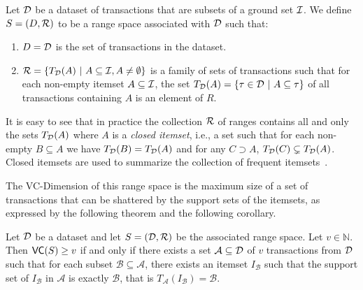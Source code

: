 \begin{definition}\label{def:vcrangespace}
  Let ${\cal D}$ be a dataset of transactions that are subsets of a ground set
  ${\cal I}$.  We define $S=(D,\mathcal{R})$ to be a range space associated with ${\cal D}$ such
  that:
  \begin{enumerate}
    \item $D={\cal D}$ is the set of transactions in the dataset.
    \item $\mathcal{R}=\{T_{\cal D}(A) ~|~ A\subseteq {\cal I}, A\neq\emptyset\}$ is a family of
      sets of transactions such that for each non-empty itemset
      $A\subseteq{\cal I}$, the set $T_{\cal D}(A)=\{\tau\in{\cal D} ~|~ A\subseteq\tau\}$ of
      all transactions containing $A$ is an element of $R$.
  \end{enumerate}
\end{definition}

It is easy to see that in practice the collection $\mathcal{R}$ of ranges contains all and only
the sets $T_{\cal D}(A)$ where $A$ is a \emph{closed itemset}, i.e., a set such that
for each non-empty $B\subseteq A$ we have $T_{\cal D}(B)=T_{\cal D}(A)$ and for any
$C\supset A$, $T_{\cal D}(C)\subsetneq T_{\cal D}(A)$. Closed itemsets are used to
summarize the collection of frequent itemsets~\citep{CaldersRB06}.

The VC-Dimension of this range space is the maximum size of a set of
transactions that can be shattered by the support sets of the itemsets, as
expressed by the following theorem and the following corollary.

\begin{theorem}
  Let ${\cal D}$ be a dataset and let $S=({\cal D},\mathcal{R})$ be the associated range
  space. Let $v\in\mathbb{N}$. Then $\mathsf{VC}(S)\ge v$ if and only if there exists a
  set $\mathcal{A}\subseteq{\cal D}$ of $v$ transactions from ${\cal D}$ such that for
  each subset $\mathcal{B}\subseteq\mathcal{A}$, there exists an itemset
  $I_\mathcal{B}$ such that the support set
  of $I_\mathcal{B}$ in $\mathcal{A}$ is exactly $\mathcal{B}$, that is
  $T_\mathcal{A}(I_\mathcal{B})=\mathcal{B}$.
\end{theorem}

